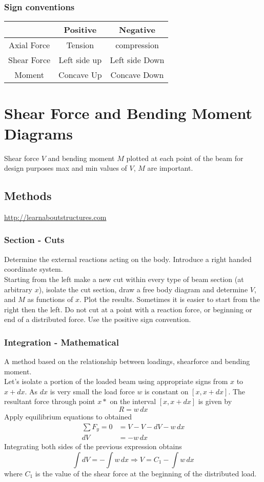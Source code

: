 \documentclass[14pt]{article}
\begin{document}
    \subsubsection{Sign conventions}
    \begin{tabular}{|c|c|c|}
        \hline
        &Positive & Negative\\
        \hline
        Axial Force& Tension& compression\\
        Shear Force& Left side up& Left side Down\\
        Moment& Concave Up& Concave Down\\
        \hline
    \end{tabular}
    \section{Shear Force and Bending Moment Diagrams}
    Shear force $V$ and bending moment $M$ plotted at each point of the beam for design purposes max and min values of $V$, $M$ are important.
    \subsection{Methods}
    \url{http://learnaboutstructures.com}
    \subsubsection{Section - Cuts}
    Determine the external reactions acting on the body. Introduce a right handed coordinate system.\\
    Starting from the left make a new cut within every type of beam section (at arbitrary $x$), isolate the cut section, draw a free body diagram and determine $V$, and $M$ as functions of $x$. 
    Plot the results. Sometimes it is easier to start from the right then the left. Do not cut at a point with a reaction force, or beginning or end of a distributed force.
    Use the positive sign convention.
    \subsubsection{Integration - Mathematical}
    A method based on the relationship between loadings, shearforce and bending moment.\\
    Let's isolate a portion of the loaded beam using appropriate signs from $x$ to $x+dx$.
    As $dx$ is very small the load force $w$ is constant on $[x, x+dx]$. The resultant force through point $x*$ on the interval $[x, x+dx]$ is given by 
    $$R=w\, dx$$
    Apply equilibrium equations to obtained
    \begin{align*}
        \sum F_y=0&=V-V-dV-w\, dx\\
        dV&=-w\, dx
    \end{align*}
    Integrating both sides of the previous expression obtains
    $$\int dV=-\int w\, dx\Rightarrow V=C_1-\int w\, dx$$
    where $C_1$ is the value of the shear force at the beginning of the distributed load.
\end{document}
